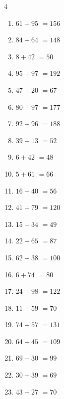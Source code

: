 \begin{multicols}{4}
\begin{enumerate}
  \item $61+95$
        $=156$

  \item $84+64$
        $=148$

  \item $8+42$
        $=50$

  \item $95+97$
        $=192$

  \item $47+20$
        $=67$

  \item $80+97$
        $=177$

  \item $92+96$
        $=188$

  \item $39+13$
        $=52$

  \item $6+42$
        $=48$

  \item $5+61$
        $=66$

  \item $16+40$
        $=56$

  \item $41+79$
        $=120$

  \item $15+34$
        $=49$

  \item $22+65$
        $=87$

  \item $62+38$
        $=100$

  \item $6+74$
        $=80$

  \item $24+98$
        $=122$

\columnbreak %

  \item $11+59$
        $=70$

  \item $74+57$
        $=131$

  \item $64+45$
        $=109$

  \item $69+30$
        $=99$

  \item $30+39$
        $=69$

  \item $43+27$
        $=70$


\end{enumerate}
\end{multicols}
